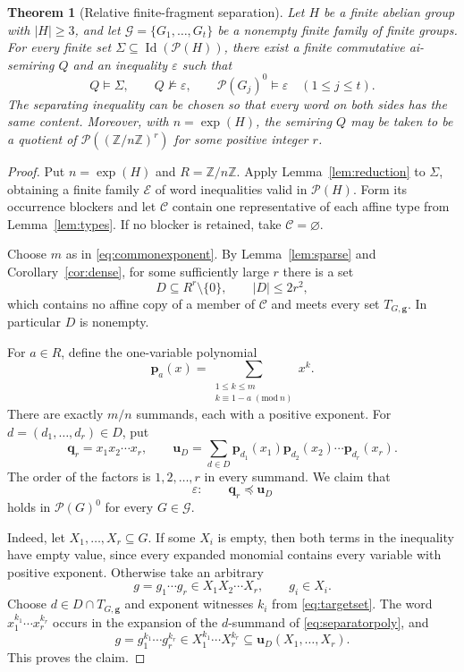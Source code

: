 \documentclass[11pt,reqno]{amsart}
\newtheorem{theorem}{Theorem}[section]
\theoremstyle{definition}
\numberwithin{equation}{section}
\newcommand{\Pow}{\mathcal{P}}
\newcommand{\Full}[1]{\mathcal{P}(#1)^0}
\newcommand{\Id}{\operatorname{Id}}
\newcommand{\expon}{\operatorname{exp}}
\newcommand{\Z}{\mathbb{Z}}
\newcommand{\bu}{\mathbf{u}}
\newcommand{\bq}{\mathbf{q}}
\newcommand{\bp}{\mathbf{p}}
\newcommand{\calC}{\mathcal{C}}
\newcommand{\calE}{\mathcal{E}}
\newcommand{\calG}{\mathcal{G}}
\renewcommand{\leq}{\leqslant}
\renewcommand{\geq}{\geqslant}
\begin{document}
\begin{theorem}[Relative finite-fragment separation]\label{thm:relative}
Let $H$ be a finite abelian group with $|H|\geq 3$, and let $\calG=\{G_1,\ldots,G_t\}$ be a nonempty finite family of finite groups. For every finite set $\Sigma\subseteq\Id(\Pow(H))$, there exist a finite commutative ai-semiring $Q$ and an inequality $\varepsilon$ such that
\[
 Q\models\Sigma,\qquad Q\not\models\varepsilon,
 \qquad \Full{G_j}\models\varepsilon\quad(1\leq j\leq t).
\]
The separating inequality can be chosen so that every word on both sides has the same content. Moreover, with $n=\expon(H)$, the semiring $Q$ may be taken to be a quotient of $\Pow((\Z/n\Z)^r)$ for some positive integer $r$.
\end{theorem}
\begin{proof}
Put $n=\expon(H)$ and $R=\Z/n\Z$. Apply Lemma~\ref{lem:reduction} to $\Sigma$, obtaining a finite family $\calE$ of word inequalities valid in $\Pow(H)$. Form its occurrence blockers and let $\calC$ contain one representative of each affine type from Lemma~\ref{lem:types}. If no blocker is retained, take $\calC=\varnothing$.

Choose $m$ as in \eqref{eq:commonexponent}. By Lemma~\ref{lem:sparse} and Corollary~\ref{cor:dense}, for some sufficiently large $r$ there is a set
\[
 D\subseteq R^r\setminus\{0\},\qquad |D|\leq 2r^2,
\]
which contains no affine copy of a member of $\calC$ and meets every set $T_{G,\boldsymbol{g}}$. In particular $D$ is nonempty.

For $a\in R$, define the one-variable polynomial
\begin{equation}\label{eq:liftpoly}
 \bp_a(x)=\sum_{\substack{1\leq k\leq m\\ k\equiv 1-a\;(\mathrm{mod}\ n)}}x^k.
\end{equation}
There are exactly $m/n$ summands, each with a positive exponent. For $d=(d_1,\ldots,d_r)\in D$, put
\begin{equation}\label{eq:separatorpoly}
 \bq_r=x_1x_2\cdots x_r,\qquad
 \bu_D=\sum_{d\in D}\bp_{d_1}(x_1)\bp_{d_2}(x_2)\cdots \bp_{d_r}(x_r).
\end{equation}
The order of the factors is $1,2,\ldots,r$ in every summand. We claim that
\begin{equation}\label{eq:epsilon}
 \varepsilon:\qquad\bq_r\preceq\bu_D
\end{equation}
holds in $\Full{G}$ for every $G\in\calG$.

Indeed, let $X_1,\ldots,X_r\subseteq G$. If some $X_i$ is empty, then both terms in the inequality have empty value, since every expanded monomial contains every variable with positive exponent. Otherwise take an arbitrary
\[
 g=g_1\cdots g_r\in X_1X_2\cdots X_r,
 \qquad g_i\in X_i.
\]
Choose $d\in D\cap T_{G,\boldsymbol{g}}$ and exponent witnesses $k_i$ from \eqref{eq:targetset}. The word $x_1^{k_1}\cdots x_r^{k_r}$ occurs in the expansion of the $d$-summand of \eqref{eq:separatorpoly}, and
\[
 g=g_1^{k_1}\cdots g_r^{k_r}
   \in X_1^{k_1}\cdots X_r^{k_r}
   \subseteq\bu_D(X_1,\ldots,X_r).
\]
This proves the claim.


\end{proof}
\end{document}
